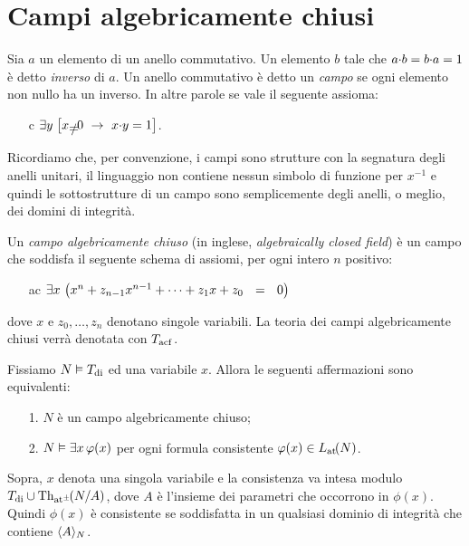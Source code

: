 \section{Campi algebricamente chiusi}

Sia $a$ un elemento di un anello commutativo. Un elemento $b$ tale che $a\mdot b=b\mdot a=1$ \`e detto \emph{inverso\/} di $a$.  Un anello commutativo \`e detto un \emph{campo\/} se ogni elemento non nullo ha un inverso. In altre parole se vale il seguente assioma:
%
\begin{itemize}
\item[c]$\E  y\; \big[x\neq0\ \imp\ x\mdot y =1\big]$.
\end{itemize}
%
Ricordiamo che, per convenzione, i campi sono strutture con la segnatura degli anelli unitari, il linguaggio non contiene nessun simbolo di funzione per $x^{-1}$ e quindi le sottostrutture di un campo sono semplicemente degli anelli, o meglio, dei domini di integrit\`a.



Un \emph{campo algebricamente chiuso\/}  (in inglese, \emph{algebraically closed field}) \`e un campo che soddisfa il seguente schema di assiomi, per ogni intero $n$ positivo:

\begin{itemize}
\item[ac] $\E x\ \big(x^{n} + z_{n-1}x^{n-1} + \dots + z_1 x + z_0\ \ =\ \ 0\big)$
\end{itemize}

dove $x$ e $z_0,\dots,z_n$ denotano singole variabili. La teoria dei campi algebricamente chiusi verr\`a denotata con \emph{$T_{\rm acf}$}.


\begin{proposition}\label{prop_acf_cons_sodd}
Fissiamo $N\models T_{\rm di}$ ed una variabile $x$. Allora le seguenti affermazioni sono equivalenti:
\begin{itemize}
\item[1.] $N$ \`e un campo algebricamente chiuso;
\item[2.] $N\models\E x\,\phi(x)$ per ogni formula consistente $\phi(x)\in\aL(N)$.
\end{itemize} 
Sopra, $x$ denota una singola variabile e la consistenza va intesa modulo $T_{\rm di}\cup\Diag(N/A)$, dove $A$ \`e l'insieme dei parametri che occorrono in $\phi(x)$. Quindi $\phi(x)$ \`e consistente se soddisfatta in un qualsiasi dominio di integrit\`a che contiene $\<A\>_N$.
\end{proposition}

